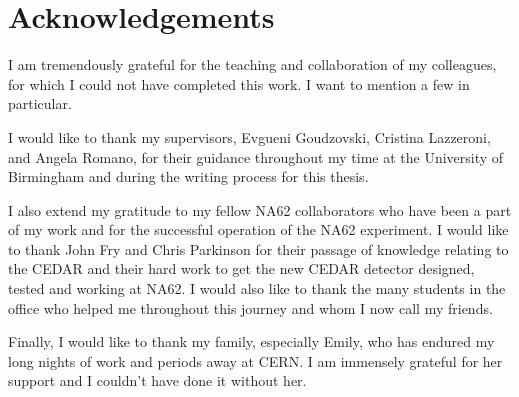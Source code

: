 \documentclass[../../main.tex]{subfiles}
\begin{document}
\begin{abstract}
The 2022--2024 data from the NA62 experiment at CERN has been used to search for dark photon ($A'$) production in the $\pi^0 \to A'\gamma$ decay, and subsequent prompt decay $A' \to e^+ e^-$. Within the mass range $6 \leq m_{A'} \leq 121.6$\,\si{\mega\electronvolt\per\clight\squared} no signal is observed and 
an exclusion limit on the mixing parameter $\epsilon^2$ across the mass range is obtained.

The NA62 beam consists of 6\,\% kaons, therefore requiring beam particle identification conducted by the KTAG. The KTAG comprises a \gls{CEDAR} and a purpose-built photon-detection system. Since 2016, NA62 has employed a \gls{CEDAR} with a nitrogen radiator gas.
To reduce the amount of material in the beam's path, a new \gls{CEDAR} utilising \gls{h2} as a radiator has been used since 2023. The \gls{ch} detector design, testing and commissioning at NA62 are presented. The \gls{CEDAR} with \gls{h2} achieved a kaon identification efficiency of 99.7\,\% and a kaon time resolution of 66\,ps.

Finally, software developments towards the design of the High Intensity Kaon Experiments (HIKE) facility are presented.
\end{abstract}
\vspace{\fill}

\newpage 
\section*{Acknowledgements}
    I am tremendously grateful for the teaching and collaboration of my colleagues, for which I could not have completed this work. I want to mention a few in particular.

    I would like to thank my supervisors, Evgueni Goudzovski, Cristina Lazzeroni, and Angela Romano, for their guidance throughout my time at the University of Birmingham and during the writing process for this thesis.
    
    I also extend my gratitude to my fellow NA62 collaborators who have been a part of my work and for the successful operation of the NA62 experiment. I would like to thank John Fry and Chris Parkinson for their passage of knowledge relating to the CEDAR and their hard work 
    to get the new CEDAR detector designed, tested and working at NA62. I would also like to thank the many students in the office who helped me throughout this journey and whom I now call my friends.

    Finally, I would like to thank my family, especially Emily, who has endured my long nights of work and periods away at CERN. I am immensely grateful for her support and I couldn't have done it without her.

    \ifSubfilesClassLoaded{%
        
    }{} 
\end{document}
